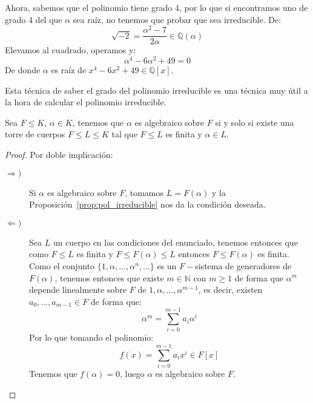 \begin{ejemplo}
\begin{equation*}
    \end{equation*}
    Ahora, sabemos que el polinomio tiene grado 4, por lo que si encontramos uno de grado 4 del que $\alpha$ sea raíz, no tenemos que probar que sea irreducible. De:
    \begin{equation*}
        \sqrt{-2} = \dfrac{\alpha^2-7}{2\alpha} \in  \mathbb{Q}(\alpha)
    \end{equation*}
    Elevamos al cuadrado, operamos y:
    \begin{equation*}
        \alpha^4 - 6\alpha^2 + 49 = 0
    \end{equation*}
    De donde $\alpha$ es raíz de $x^4-6x^2+49\in \mathbb{Q}[x]$.
\end{ejemplo}

Esta técnica de saber el grado del polinomio irreducible es una técnica muy útil a la hora de calcular el polinomio irreducible.\\


\begin{prop}
    Sea $F\leq K$, $\alpha\in K$, tenemos que $\alpha$ es algebraico sobre $F$ si y solo si existe una torre de cuerpos $F\leq L \leq K$ tal que $F\leq L$ es finita y $\alpha\in L$.
    \begin{proof}
        Por doble implicación:
        \begin{description}
            \item [$\Longrightarrow )$] Si $\alpha$ es algebraico sobre $F$, tomamos $L = F(\alpha)$ y la Proposición~\ref{prop:pol_irreducible} nos da la condición deseada.
            \item [$\Longleftarrow )$] Sea $L$ un cuerpo en las condiciones del enunciado, tenemos entonces que como $F\leq L$ es finita y $F\leq F(\alpha)\leq L$ entonces $F\leq F(\alpha)$ es finita. Como el conjunto $\{1,\alpha,\ldots, \alpha^n, \ldots\}$ es un $F-$sistema de generadores de $F(\alpha)$, tenemos entonces que existe $m\in \mathbb{N}$ con $m\geq 1$ de forma que $\alpha^m$ depende linealmente sobre $F$ de $1,\alpha,\ldots,\alpha^{m-1}$, es decir, existen $a_0,\ldots,a_{m-1}\in F$ de forma que:
                \begin{equation*}
                    \alpha^m = \sum_{i=0}^{m-1}a_i \alpha^i
                \end{equation*}
                Por lo que tomando el polinomio:
                \begin{equation*}
                    f(x) = \sum_{i=0}^{m-1}a_i x^i \in F[x]
                \end{equation*}
                Tenemos que $f(\alpha)=0$, luego $\alpha$ es algebraico sobre $F$.
        \end{description}
    \end{proof}
\end{prop}

